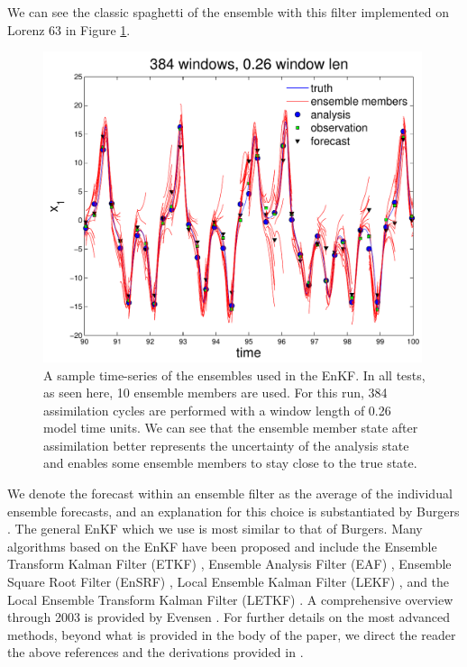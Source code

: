 \documentclass[pre,twocolumn,twoside,byrevtex,superscriptaddress]{revtex4}
\begin{document}
We can see the classic spaghetti of the ensemble with this filter implemented on Lorenz 63 in Figure \ref{fig:spaghetti}.

\begin{figure}[h]
  \centering
  \includegraphics[width=0.99\textwidth]{fig16_EnKF_spaghetti.pdf}
  \caption[A sample time-series of the ensembles used in the EnKF]{
    A sample time-series of the ensembles used in the EnKF.
    In all tests, as seen here, 10 ensemble members are used.
    For this run, 384 assimilation cycles are performed with a window length of 0.26 model time units.
    We can see that the ensemble member state after assimilation better represents the uncertainty of the analysis state and enables some ensemble members to stay close to the true state.
  }
  \label{fig:spaghetti}
\end{figure}

We denote the forecast within an ensemble filter as the average of the individual ensemble forecasts, and an explanation for this choice is substantiated by Burgers \cite{burgers1998analysis}.
The general EnKF which we use is most similar to that of Burgers.
Many algorithms based on the EnKF have been proposed and include the Ensemble Transform Kalman Filter (ETKF) \cite{ott2004local}, Ensemble Analysis Filter (EAF) \cite{anderson2001new}, Ensemble Square Root Filter (EnSRF) \cite{tippett2003ensemble}, Local Ensemble Kalman Filter (LEKF) \cite{ott2004local}, and the Local Ensemble Transform Kalman Filter (LETKF) \cite{hunt2007efficient}.
A comprehensive overview through 2003 is provided by Evensen \cite{evensen2003ensemble}.
For further details on the most advanced methods, beyond what is provided in the body of the paper, we direct the reader the above references and the derivations provided in \cite{reagan2013}.
\end{document}
